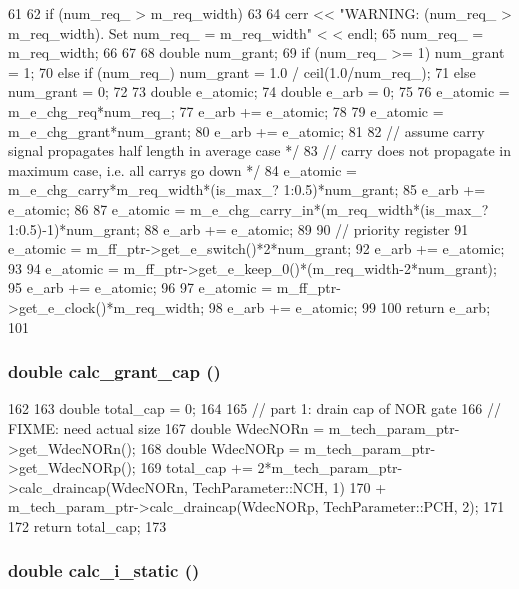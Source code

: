 \begin{DoxyCode}
61 {
62     if (num_req_ > m_req_width)
63     {
64         cerr << "WARNING: (num_req_ > m_req_width). Set num_req_ = m_req_width" <
      < endl;
65         num_req_ = m_req_width;
66     }
67 
68     double num_grant;
69     if (num_req_ >= 1) num_grant = 1;
70     else if (num_req_) num_grant = 1.0 / ceil(1.0/num_req_);
71     else num_grant = 0;
72 
73     double e_atomic;
74     double e_arb = 0;
75 
76     e_atomic = m_e_chg_req*num_req_;
77     e_arb += e_atomic;
78 
79     e_atomic = m_e_chg_grant*num_grant;
80     e_arb += e_atomic;
81 
82     // assume carry signal propagates half length in average case */
83     // carry does not propagate in maximum case, i.e. all carrys go down */
84     e_atomic = m_e_chg_carry*m_req_width*(is_max_? 1:0.5)*num_grant;
85     e_arb += e_atomic;
86 
87     e_atomic = m_e_chg_carry_in*(m_req_width*(is_max_? 1:0.5)-1)*num_grant;
88     e_arb += e_atomic;
89 
90     // priority register
91     e_atomic = m_ff_ptr->get_e_switch()*2*num_grant;
92     e_arb += e_atomic;
93 
94     e_atomic = m_ff_ptr->get_e_keep_0()*(m_req_width-2*num_grant);
95     e_arb += e_atomic;
96 
97     e_atomic = m_ff_ptr->get_e_clock()*m_req_width;
98     e_arb += e_atomic;
99 
100     return e_arb;
101 }
\end{DoxyCode}
\hypertarget{classRRArbiter_a1ca031abb0d310b02168d439e1e858d2}{
\subsubsection[{calc\_\-grant\_\-cap}]{\setlength{\rightskip}{0pt plus 5cm}double calc\_\-grant\_\-cap ()}}
\label{classRRArbiter_a1ca031abb0d310b02168d439e1e858d2}



\begin{DoxyCode}
162 {
163     double total_cap = 0;
164 
165     // part 1: drain cap of NOR gate
166     // FIXME: need actual size
167     double WdecNORn = m_tech_param_ptr->get_WdecNORn();
168     double WdecNORp = m_tech_param_ptr->get_WdecNORp();
169     total_cap += 2*m_tech_param_ptr->calc_draincap(WdecNORn, TechParameter::NCH, 
      1)
170         + m_tech_param_ptr->calc_draincap(WdecNORp, TechParameter::PCH, 2);
171 
172     return total_cap;
173 }
\end{DoxyCode}
\hypertarget{classRRArbiter_a0027807356ac4ca07fe2e593234eb884}{
\subsubsection[{calc\_\-i\_\-static}]{\setlength{\rightskip}{0pt plus 5cm}double calc\_\-i\_\-static ()}}
\label{classRRArbiter_a0027807356ac4ca07fe2e593234eb884}



